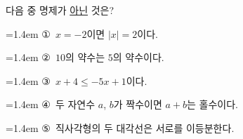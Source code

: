 다음 중 명제가 \underline{아닌} 것은?
\par\medskip\par\noindent\hangindent=1.4em {\small ①}\ $x=-2$이면 $|x|=2$이다.\par\noindent\hangindent=1.4em {\small ②}\ $10$의 약수는 $5$의 약수이다.\par\noindent\hangindent=1.4em {\small ③}\ $x+4\le -5x+1$이다.\par\noindent\hangindent=1.4em {\small ④}\ 두 자연수 $a$, $b$가 짝수이면 $a+b$는 홀수이다.\par\noindent\hangindent=1.4em {\small ⑤}\ 직사각형의 두 대각선은 서로를 이등분한다.\par\medskip

